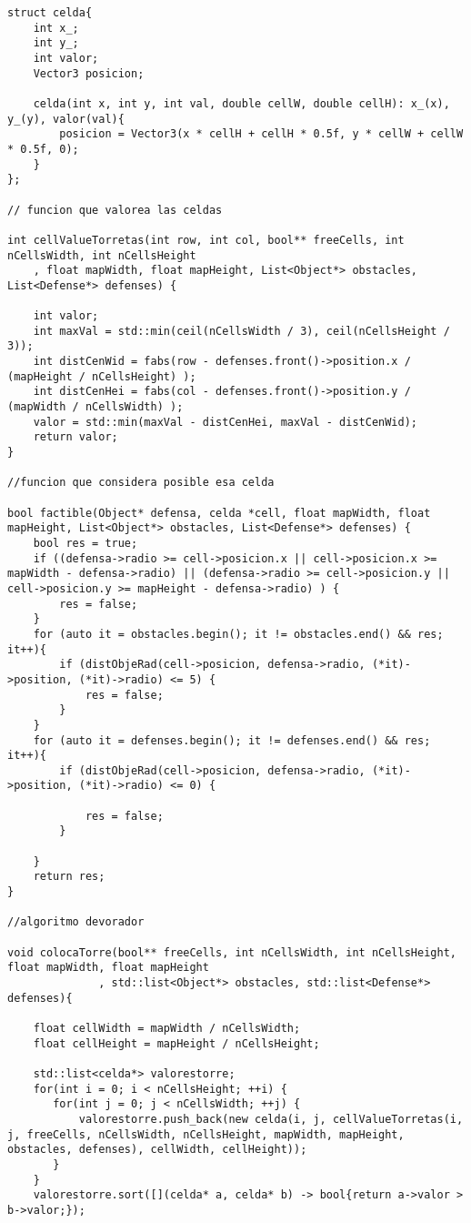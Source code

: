 \begin{lstlisting}
struct celda{
    int x_;
    int y_;
    int valor;
    Vector3 posicion;

    celda(int x, int y, int val, double cellW, double cellH): x_(x), y_(y), valor(val){
        posicion = Vector3(x * cellH + cellH * 0.5f, y * cellW + cellW * 0.5f, 0);
    }
};

// funcion que valorea las celdas

int cellValueTorretas(int row, int col, bool** freeCells, int nCellsWidth, int nCellsHeight
	, float mapWidth, float mapHeight, List<Object*> obstacles, List<Defense*> defenses) {
    
    int valor;
    int maxVal = std::min(ceil(nCellsWidth / 3), ceil(nCellsHeight / 3));
    int distCenWid = fabs(row - defenses.front()->position.x / (mapHeight / nCellsHeight) );
    int distCenHei = fabs(col - defenses.front()->position.y / (mapWidth / nCellsWidth) );
    valor = std::min(maxVal - distCenHei, maxVal - distCenWid);
    return valor;
}

//funcion que considera posible esa celda

bool factible(Object* defensa, celda *cell, float mapWidth, float mapHeight, List<Object*> obstacles, List<Defense*> defenses) {
    bool res = true;
    if ((defensa->radio >= cell->posicion.x || cell->posicion.x >= mapWidth - defensa->radio) || (defensa->radio >= cell->posicion.y || cell->posicion.y >= mapHeight - defensa->radio) ) {
        res = false;
    }
    for (auto it = obstacles.begin(); it != obstacles.end() && res; it++){
        if (distObjeRad(cell->posicion, defensa->radio, (*it)->position, (*it)->radio) <= 5) {
            res = false;
        }
    }
    for (auto it = defenses.begin(); it != defenses.end() && res; it++){
        if (distObjeRad(cell->posicion, defensa->radio, (*it)->position, (*it)->radio) <= 0) {
            
            res = false;
        }
        
    }
    return res;   
}

//algoritmo devorador

void colocaTorre(bool** freeCells, int nCellsWidth, int nCellsHeight, float mapWidth, float mapHeight
              , std::list<Object*> obstacles, std::list<Defense*> defenses){

    float cellWidth = mapWidth / nCellsWidth;
    float cellHeight = mapHeight / nCellsHeight; 

    std::list<celda*> valorestorre;
    for(int i = 0; i < nCellsHeight; ++i) {
       for(int j = 0; j < nCellsWidth; ++j) {
           valorestorre.push_back(new celda(i, j, cellValueTorretas(i, j, freeCells, nCellsWidth, nCellsHeight, mapWidth, mapHeight, obstacles, defenses), cellWidth, cellHeight));
       }
    }
    valorestorre.sort([](celda* a, celda* b) -> bool{return a->valor > b->valor;});


\end{lstlisting}
